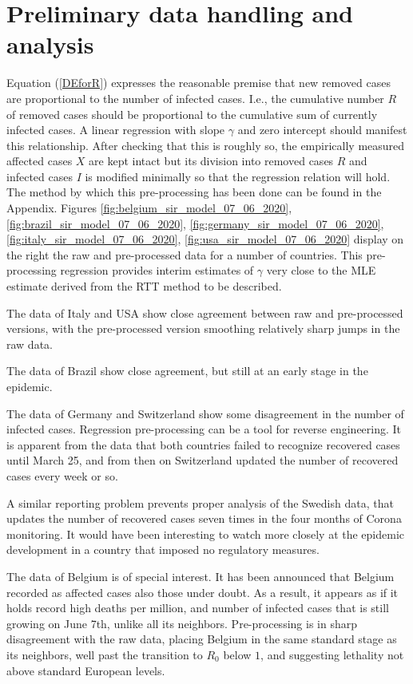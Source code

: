 \documentclass{article}
\begin{document}
\section{Preliminary data handling and analysis} \label{preliminarysection}

Equation (\ref{DEforR}) expresses the reasonable premise that new removed cases are proportional to the number of infected cases. I.e., the cumulative number $R$ of removed cases should be proportional to the cumulative sum of currently infected cases. A linear regression with slope $\gamma$ and zero intercept should manifest this relationship. After checking that this is roughly so, the empirically measured affected cases $X$ are kept intact but its division into removed cases $R$ and infected cases $I$ is modified minimally so that the regression relation will hold. The method by which this pre-processing has been done can be found in the Appendix. Figures \ref{fig:belgium_sir_model_07_06_2020}, \ref{fig:brazil_sir_model_07_06_2020}, \ref{fig:germany_sir_model_07_06_2020}, \ref{fig:italy_sir_model_07_06_2020}, \ref{fig:usa_sir_model_07_06_2020} display on the right the raw and pre-processed data for a number of countries. This pre-processing regression provides interim estimates of $\gamma$ very close to the MLE estimate derived from the RTT method to be described.

The data of Italy and USA show close agreement between raw and pre-processed versions, with the pre-processed version smoothing relatively sharp jumps in the raw data.

The data of Brazil show close agreement, but still at an early stage in the epidemic.

The data of Germany and Switzerland show some disagreement in the number of infected cases. Regression pre-processing can be a tool for reverse engineering. It is apparent from the data that both countries failed to recognize recovered cases until March 25, and from then on Switzerland updated the number of recovered cases every week or so.

A similar reporting problem prevents proper analysis of the Swedish data, that updates the number of recovered cases seven times in the four months of Corona monitoring. It would have been interesting to watch more closely at the epidemic development in a country that imposed no regulatory measures.

The data of Belgium is of special interest. It has been announced that Belgium recorded as affected cases also those under doubt. As a result, it appears as if it holds record high deaths per million, and number of infected cases that is still growing on June 7th, unlike all its neighbors. Pre-processing is in sharp disagreement with the raw data, placing Belgium in the same standard stage as its neighbors, well past the transition to $R_0$ below $1$, and suggesting lethality not above standard European levels.
\end{document}
